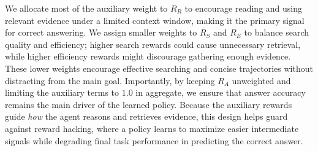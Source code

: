 \documentclass[11pt]{article}
\newcommand{\jk}[1]{\textcolor{olive}{\bf [sf: #1]}}
\newcommand{\vn}[1]{\textcolor{blue}{\bf [varun: #1]}}
\begin{document}
We allocate most of the auxiliary weight to $R_R$ to encourage reading and using relevant evidence under a limited context window, making it the primary signal for correct answering. We assign smaller weights to $R_S$ and $R_E$ to balance search quality and efficiency; higher search rewards could cause unnecessary retrieval, while higher efficiency rewards might discourage gathering enough evidence. These lower weights encourage effective searching and concise trajectories without distracting from the main goal. 
%
Importantly, by keeping $R_A$ unweighted and limiting the auxiliary terms to $1.0$ in aggregate, we ensure that answer accuracy remains the main driver of the learned policy. Because the auxiliary rewards guide \emph{how} the agent reasons and retrieves evidence, this design helps guard against reward hacking, where a policy learns to maximize easier intermediate signals while degrading final task performance in predicting the correct answer.
%



\end{document}
